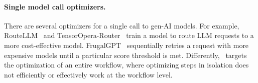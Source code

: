 \paragraph{Single model call optimizers.} There are several optimizers for a single call to gen-AI models. For example, RouteLLM~\cite{routellm} and TensorOpera-Router~\cite{tensor-opera-router} train a model to route LLM requests to a more cost-effective model. %
FrugalGPT~\cite{frugalgpt} sequentially retries a request with more expensive models until a particular score threshold is met. 
Differently, \sysname\ targets the optimization of an entire workflow, where optimizing steps in isolation does not efficiently or effectively work at the workflow level.

